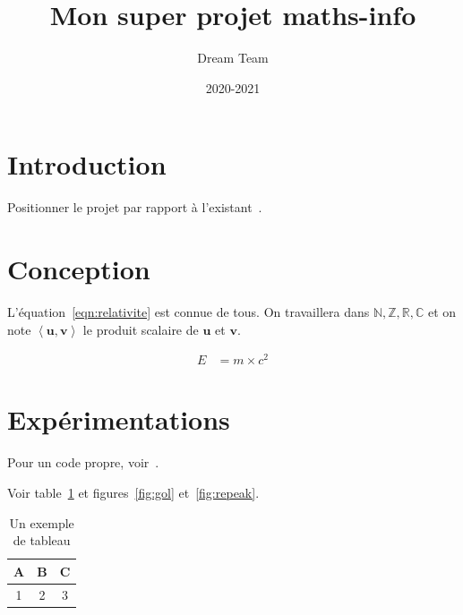\documentclass[11pt,a4paper]{article}
\title{Mon super projet maths-info}
\author{Dream Team}
\date{2020-2021}
\def\energie{E}
\def\masse{m}
\def\vitesse{c}
\def\setN{\mathbb{N}}
\def\setZ{\mathbb{Z}}
\def\setR{\mathbb{R}}
\def\setC{\mathbb{C}}
\newcommand{\pscalaire}[2]{\left < #1, #2 \right >}
\begin{document}
\maketitle


\tableofcontents
\clearpage
\section{Introduction}

\lipsum[2-4]

Positionner le projet par rapport à l'existant~\cite{Pedregosa2011Scikit, Rahimi2008Random}.

\section{Conception}
\lipsum[5]

L'équation~\eqref{eqn:relativite} est connue de tous. On travaillera dans $\setN, \setZ, \setR, \setC$ et on note $\pscalaire{\mathbf{u}}{\mathbf{v}}$ le produit scalaire de $\mathbf{u}$ et $\mathbf{v}$.

\begin{align}
\energie & = \masse \times \vitesse^2
\label{eqn:relativite}
\end{align}

\section{Expérimentations}
\lipsum[6]

Pour un code propre, voir~\cite{martin2009clean}.

Voir table~\ref{tab:exemple} et figures~\ref{fig:gol} et~\ref{fig:repeak}.

\begin{table}[tbh]
\centering
\begin{tabular}{|c|c|c|}
\hline
A & B & C\\
\hline
1 & 2 & 3\\
\hline
\end{tabular}
\caption{\label{tab:exemple} Un exemple de tableau}
\end{table}

\lipsum[7]
\end{document}
